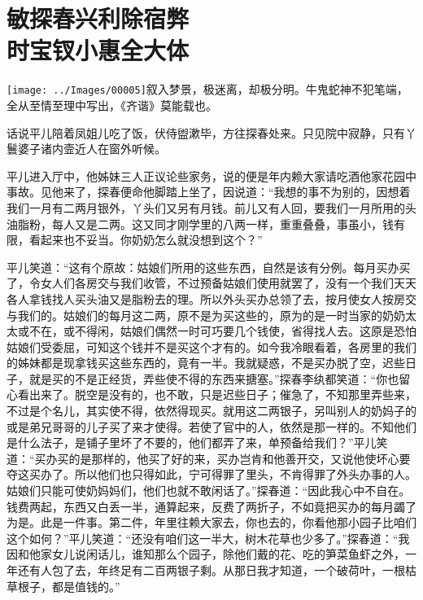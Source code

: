 

\chapter{敏探春兴利除宿弊\\时宝钗小惠全大体}

{\texttt{[image: ../Images/00005]}叙入梦景，极迷离，却极分明。牛鬼蛇神不犯笔端，全从至情至理中写出，《齐谐》莫能载也。}

话说平儿陪着凤姐儿吃了饭，伏侍盥漱毕，方往探春处来。只见院中寂静，只有丫鬟婆子诸内壸近人在窗外听候。

平儿进入厅中，他姊妹三人正议论些家务，说的便是年内赖大家请吃酒他家花园中事故。见他来了，探春便命他脚踏上坐了，因说道：``我想的事不为别的，因想着我们一月有二两月银外，丫头们又另有月钱。前儿又有人回，要我们一月所用的头油脂粉，每人又是二两。这又同才刚学里的八两一样，重重叠叠，事虽小，钱有限，看起来也不妥当。你奶奶怎么就没想到这个？''

平儿笑道：``这有个原故：姑娘们所用的这些东西，自然是该有分例。每月买办买了，令女人们各房交与我们收管，不过预备姑娘们使用就罢了，没有一个我们天天各人拿钱找人买头油又是脂粉去的理。所以外头买办总领了去，按月使女人按房交与我们的。姑娘们的每月这二两，原不是为买这些的，原为的是一时当家的奶奶太太或不在，或不得闲，姑娘们偶然一时可巧要几个钱使，省得找人去。这原是恐怕姑娘们受委屈，可知这个钱并不是买这个才有的。如今我冷眼看着，各房里的我们的姊妹都是现拿钱买这些东西的，竟有一半。我就疑惑，不是买办脱了空，迟些日子，就是买的不是正经货，弄些使不得的东西来搪塞。''探春李纨都笑道：``你也留心看出来了。脱空是没有的，也不敢，只是迟些日子；催急了，不知那里弄些来，不过是个名儿，其实使不得，依然得现买。就用这二两银子，另叫别人的奶妈子的或是弟兄哥哥的儿子买了来才使得。若使了官中的人，依然是那一样的。不知他们是什么法子，是铺子里坏了不要的，他们都弄了来，单预备给我们？''平儿笑道：``买办买的是那样的，他买了好的来，买办岂肯和他善开交，又说他使坏心要夺这买办了。所以他们也只得如此，宁可得罪了里头，不肯得罪了外头办事的人。姑娘们只能可使奶妈妈们，他们也就不敢闲话了。''探春道：``因此我心中不自在。钱费两起，东西又白丢一半，通算起来，反费了两折子，不如竟把买办的每月蠲了为是。此是一件事。第二件，年里往赖大家去，你也去的，你看他那小园子比咱们这个如何？''平儿笑道：``还没有咱们这一半大，树木花草也少多了。''探春道：``我因和他家女儿说闲话儿，谁知那么个园子，除他们戴的花、吃的笋菜鱼虾之外，一年还有人包了去，年终足有二百两银子剩。从那日我才知道，一个破荷叶，一根枯草根子，都是值钱的。''

